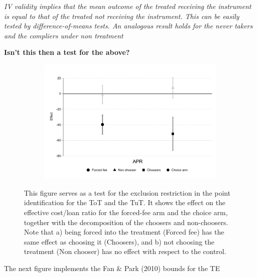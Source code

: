 \documentclass[oneside,11pt]{article}
\begin{document}
\textit{IV validity implies that the mean outcome of the treated receiving the instrument is equal to that of the treated not receiving the instrument. This can be easily tested by difference-of-means tests. An analogous result holds for the never takers and the compliers under non treatment}


\textbf{Isn't this then a test for the above?}



\begin{figure}[H]
     \caption{Exclusion restriction}
     \label{exclusion_restriction}
    \begin{center}
    \begin{subfigure}{0.6\textwidth}
        \centering
        \includegraphics[width=\textwidth]{Figuras/exclusion_restriction.pdf}
    \end{subfigure}
    \end{center}
    \scriptsize This figure serves as a test for the exclusion restriction in the point identification for the ToT and the TuT. It shows the effect on the effective cost/loan ratio for the forced-fee arm and the choice arm, together with the decomposition of the choosers and non-choosers. Note that a) being forced into the treatment (Forced fee) has the same effect as choosing it (Choosers), and b) not choosing the treatment (Non chooser) has no effect with respect to the control.
    
\end{figure}




The next figure implements the  Fan \& Park (2010) bounds for the TE
\end{document}
